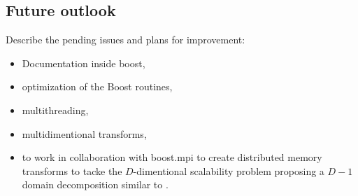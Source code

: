 
\subsection{Future outlook}
Describe the pending issues and plans for improvement:
\begin{itemize}
    \item Documentation inside boost,
    \item optimization of the Boost routines,
    \item multithreading,
    \item multidimentional transforms,
    \item to work in collaboration with boost.mpi to create distributed memory
    transforms to tacke the $D$-dimentional scalability problem proposing a
    $D-1$ domain decomposition similar to \cite{pippig_13}.
\end{itemize}
